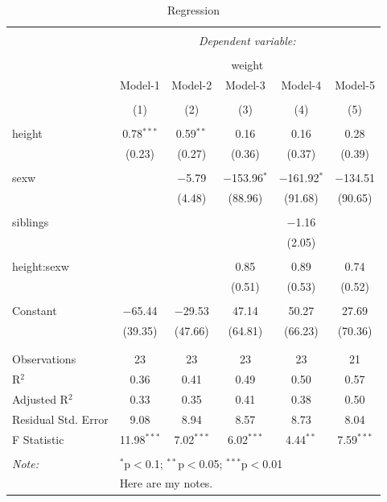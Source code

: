 \documentclass[
  doc]{apa6}
\begin{document}
\newpage

\begin{table}[!htbp] \centering 
  \caption{Regression} 
  \label{} 
\small 
\begin{tabular}{@{\extracolsep{5pt}}lccccc} 
\\[-1.8ex]\hline 
\hline \\[-1.8ex] 
 & \multicolumn{5}{c}{\textit{Dependent variable:}} \\ 
\cline{2-6} 
\\[-1.8ex] & \multicolumn{5}{c}{weight} \\ 
 & Model-1 & Model-2 & Model-3 & Model-4 & Model-5 \\ 
\\[-1.8ex] & (1) & (2) & (3) & (4) & (5)\\ 
\hline \\[-1.8ex] 
 height & 0.78$^{***}$ & 0.59$^{**}$ & 0.16 & 0.16 & 0.28 \\ 
  & (0.23) & (0.27) & (0.36) & (0.37) & (0.39) \\ 
  & & & & & \\ 
 sexw &  & $-$5.79 & $-$153.96$^{*}$ & $-$161.92$^{*}$ & $-$134.51 \\ 
  &  & (4.48) & (88.96) & (91.68) & (90.65) \\ 
  & & & & & \\ 
 siblings &  &  &  & $-$1.16 &  \\ 
  &  &  &  & (2.05) &  \\ 
  & & & & & \\ 
 height:sexw &  &  & 0.85 & 0.89 & 0.74 \\ 
  &  &  & (0.51) & (0.53) & (0.52) \\ 
  & & & & & \\ 
 Constant & $-$65.44 & $-$29.53 & 47.14 & 50.27 & 27.69 \\ 
  & (39.35) & (47.66) & (64.81) & (66.23) & (70.36) \\ 
  & & & & & \\ 
\hline \\[-1.8ex] 
Observations & 23 & 23 & 23 & 23 & 21 \\ 
R$^{2}$ & 0.36 & 0.41 & 0.49 & 0.50 & 0.57 \\ 
Adjusted R$^{2}$ & 0.33 & 0.35 & 0.41 & 0.38 & 0.50 \\ 
Residual Std. Error & 9.08 & 8.94 & 8.57 & 8.73 & 8.04 \\ 
F Statistic & 11.98$^{***}$ & 7.02$^{***}$ & 6.02$^{***}$ & 4.44$^{**}$ & 7.59$^{***}$ \\ 
\hline 
\hline \\[-1.8ex] 
\textit{Note:}  & \multicolumn{5}{l}{$^{*}$p$<$0.1; $^{**}$p$<$0.05; $^{***}$p$<$0.01} \\ 
 & \multicolumn{5}{l}{Here are my notes.} \\ 
\end{tabular} 
\end{table}
\end{document}
